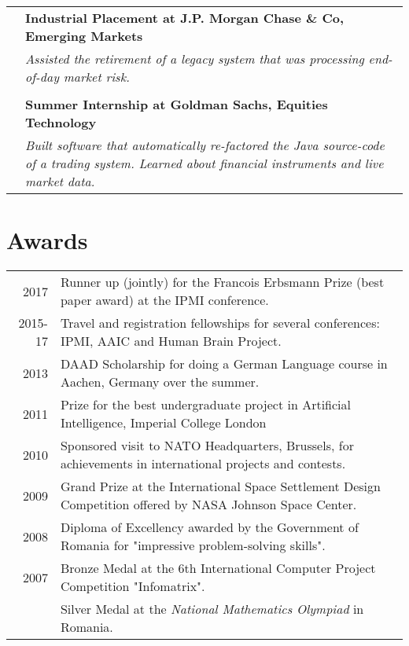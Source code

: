 \documentclass[a4paper,10pt]{article} %
\begin{document}
\begin{tabular}{>{\raggedleft\arraybackslash} p{0.93cm}|p{15cm}}
2013 & \large\textbf{Industrial Placement at J.P. Morgan Chase \& Co, Emerging
Markets}\\
 & \emph{Assisted the retirement of a legacy system that was processing end-of-day market risk.}\\\\

2012 & \large\textbf{Summer Internship at Goldman Sachs, Equities Technology}\\
 & \emph{Built software that automatically re-factored the Java source-code of a trading system. Learned about financial instruments and live market data.}\\




\end{tabular}


\section*{Awards}

\begin{tabular}{r|p{15.7cm}}
2017 & Runner up (jointly) for the Francois Erbsmann Prize (best paper award) at the IPMI conference.\\
2015-17 & Travel and registration fellowships for several conferences: IPMI, AAIC and Human Brain Project.\\
2013 & DAAD Scholarship for doing a German Language course in Aachen, Germany over the summer.\\
2011 & Prize for the best undergraduate project in Artificial Intelligence, Imperial College London\\
2010 & Sponsored visit to NATO Headquarters, Brussels, for achievements in international projects and contests.\\
2009 & Grand Prize at the International Space Settlement Design Competition offered by NASA Johnson Space Center.\\
2008 & Diploma of Excellency awarded by the Government of Romania for "impressive problem-solving skills".\\
2007 & Bronze Medal at the 6th International Computer Project Competition
"Infomatrix".\\
& Silver Medal at the \emph{National Mathematics Olympiad} in Romania.
\end{tabular}
\end{document}
